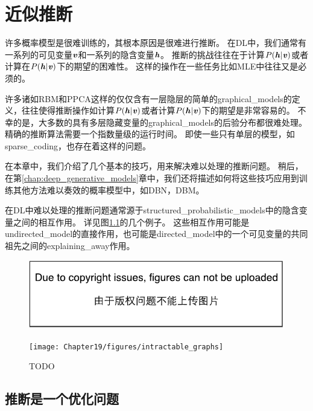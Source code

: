\chapter{近似推断}
\label{chap:approximate_inference}


许多概率模型是很难训练的，其根本原因是很难进行推断。
在\gls{DL}中，我们通常有一系列的可见变量$\boldsymbol{\mathit{v}}$和一系列的隐含变量$\boldsymbol{\mathit{h}}$。
推断的挑战往往在于计算$P(\boldsymbol{\mathit{h}}\vert\boldsymbol{\mathit{v}})$或者计算在$P(\boldsymbol{\mathit{h}}\vert\boldsymbol{\mathit{v}})$下的期望的困难性。
这样的操作在一些任务比如\gls{MLE}中往往又是必须的。

许多诸如\gls{RBM}和\gls{PPCA}这样的仅仅含有一层隐层的简单的\gls{graphical_models}的定义，往往使得推断操作如计算$P(\boldsymbol{\mathit{h}}\vert\boldsymbol{\mathit{v}})$或者计算$P(\boldsymbol{\mathit{h}}\vert\boldsymbol{\mathit{v}})$下的期望是非常容易的。
不幸的是，大多数的具有多层隐藏变量的\gls{graphical_models}的后验分布都很难处理。
精确的推断算法需要一个指数量级的运行时间。
即使一些只有单层的模型，如\gls{sparse_coding}，也存在着这样的问题。


在本章中，我们介绍了几个基本的技巧，用来解决难以处理的推断问题。
稍后，在第\ref{chap:deep_generative_models}章中，我们还将描述如何将这些技巧应用到训练其他方法难以奏效的概率模型中，如\gls{DBN}，\gls{DBM}。


在\gls{DL}中难以处理的推断问题通常源于\gls{structured_probabilistic_models}中的隐含变量之间的相互作用。
详见图\ref{fig:intractable_graphs}的几个例子。
这些相互作用可能是\gls{undirected_model}的直接作用，也可能是\gls{directed_model}中的一个可见变量的共同祖先之间的\gls{explaining_away}作用。


\begin{figure}[!htb]
\ifOpenSource
\centerline{\includegraphics{figure.pdf}}
\else
	\centerline{\texttt{[image: Chapter19/figures/intractable\_graphs]}}
\fi
	\caption{TODO}
	\label{fig:intractable_graphs}
\end{figure}


\section{推断是一个优化问题}
\label{sec:inference_as_optimization}

